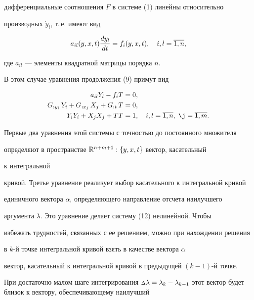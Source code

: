 дифференциальные соотношения $F$ в системе (1) линейны относительно


производных $\Dot y_i$, т.\,е. имеют вид


$$


a_{il}(y, x, t)\derhd{y_l}{t}=f_i(y, x, t),


\quad i,l=\overline{1, n},


$$


где $a_{il}$ --- элементы квадратной матрицы порядка $n$.


В этом случае уравнения продолжения (9) примут вид


\begin{equation}


\begin{split}


a_{il}Y_l - f_iT & = 0,\\


G,_{y_i}Y_i + G,_{x_j}X_j + G,_tT & = 0,\\


Y_iY_i  + X_jX_j + TT & = 1,\quad


i, l=\overline{1, n},\; \j=\overline{1, m}.


\end{split}


\end{equation}


Первые два уравнения этой системы с точностью до постоянного множителя


определяют в пространстве $\Bbb R^{n+m+1}: \{y, x, t\}$ вектор, касательный


к интегральной


кривой. Третье уравнение реализует выбор касательного к интегральной кривой


единичного вектора $\alpha$, определяющего направление отсчета  наилучшего


аргумента $\lambda$. Это уравнение делает систему (12) нелинейной. Чтобы


избежать трудностей, связанных с ее решением, можно при нахождении решения


в $k$-й точке интегральной кривой взять в качестве вектора $\alpha$


вектор, касательный к интегральной кривой в предыдущей $(k{-}1)$-й точке.


При достаточно малом шаге интегрирования $\Deltas\lambda= \lambda_k -


\lambda_{k-1}$ этот вектор будет близок к вектору, обеспечивающему наилучший


